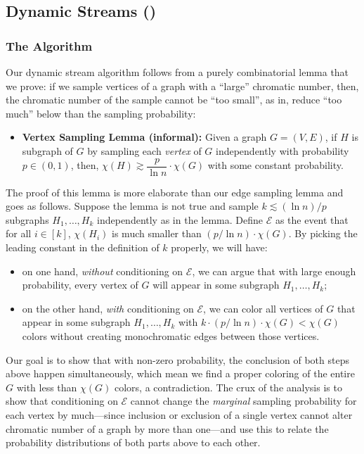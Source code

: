 \documentclass[11pt]{article}
\theoremstyle{definition}
\newcommand{\event}{\ensuremath{\mathcal{E}}}
\begin{document}
\subsection{Dynamic Streams ()}\label{sec:tech-dynamic}

\subsubsection{The Algorithm} 
Our dynamic stream algorithm follows from a purely combinatorial lemma that we prove: if we sample vertices of a graph with a ``large'' chromatic number, then, the chromatic number of the sample
cannot be ``too small'', as in, reduce ``too much'' below than the sampling probability: 
\begin{itemize}
	\item[]\textbf{Vertex Sampling Lemma (informal):} Given a graph $G=(V,E)$, if $H$ is subgraph of $G$ by sampling each \emph{vertex} of $G$ independently with probability $p \in (0,1)$, 
	then, $\chi(H) \gtrsim \dfrac{p}{\ln{n}} \cdot \chi(G)$ with some constant probability. 
\end{itemize}
\noindent
The proof of this lemma is more elaborate than our edge sampling lemma and goes as follows. Suppose the lemma is not true and sample $k \lesssim (\ln{n})/p$ subgraphs $H_1,\ldots,H_k$
independently as in the lemma. Define $\event$ as the event that for all $i \in [k]$, $\chi(H_i)$ is much smaller than $(p/\ln{n}) \cdot \chi(G)$. By picking the leading constant in the definition of $k$ properly, we will have: 
\begin{itemize}
	\item on one hand, \emph{without} conditioning on $\event$, we can argue that with large enough probability, every vertex of $G$ will appear in some subgraph $H_1,\ldots,H_k$; 
	\item on the other hand, \emph{with} conditioning on $\event$, we can color all vertices of $G$ that appear in some subgraph $H_1,\ldots,H_k$ with $k \cdot (p/\ln{n}) \cdot \chi(G) < \chi(G)$ colors without creating monochromatic 
	edges between those vertices. 
\end{itemize}
Our goal is to show that with non-zero probability, the conclusion of both steps above happen simultaneously, which mean we find a proper coloring of the entire $G$ with less than $\chi(G)$ colors, a contradiction. The crux of the analysis 
is to show that conditioning on $\event$ cannot change the \emph{marginal} sampling probability for each vertex by much---since inclusion or exclusion of a single vertex cannot alter chromatic number of
a graph by more than one---and use this to relate the probability distributions of both parts above to each other. 
\end{document}
